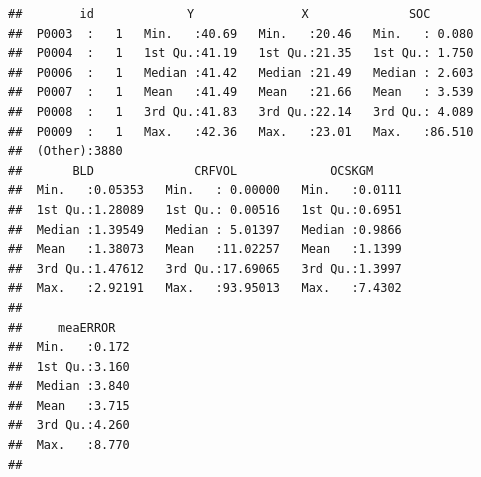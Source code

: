 \documentclass[10pt,b5paper,]{book}
\newenvironment{Shaded}{\begin{snugshade}}{\end{snugshade}}
\newcommand{\CommentTok}[1]{\textcolor[rgb]{0.56,0.35,0.01}{\textit{#1}}}
\newcommand{\DataTypeTok}[1]{\textcolor[rgb]{0.13,0.29,0.53}{#1}}
\newcommand{\DecValTok}[1]{\textcolor[rgb]{0.00,0.00,0.81}{#1}}
\newcommand{\KeywordTok}[1]{\textcolor[rgb]{0.13,0.29,0.53}{\textbf{#1}}}
\newcommand{\NormalTok}[1]{#1}
\newcommand{\OperatorTok}[1]{\textcolor[rgb]{0.81,0.36,0.00}{\textbf{#1}}}
\newcommand{\StringTok}[1]{\textcolor[rgb]{0.31,0.60,0.02}{#1}}
\theoremstyle{definition}
\theoremstyle{definition}
\theoremstyle{definition}
\theoremstyle{remark}
\begin{document}
\begin{Shaded}
\end{Shaded}

\begin{verbatim}
##        id             Y               X              SOC        
##  P0003  :   1   Min.   :40.69   Min.   :20.46   Min.   : 0.080  
##  P0004  :   1   1st Qu.:41.19   1st Qu.:21.35   1st Qu.: 1.750  
##  P0006  :   1   Median :41.42   Median :21.49   Median : 2.603  
##  P0007  :   1   Mean   :41.49   Mean   :21.66   Mean   : 3.539  
##  P0008  :   1   3rd Qu.:41.83   3rd Qu.:22.14   3rd Qu.: 4.089  
##  P0009  :   1   Max.   :42.36   Max.   :23.01   Max.   :86.510  
##  (Other):3880                                                   
##       BLD              CRFVOL             OCSKGM      
##  Min.   :0.05353   Min.   : 0.00000   Min.   :0.0111  
##  1st Qu.:1.28089   1st Qu.: 0.00516   1st Qu.:0.6951  
##  Median :1.39549   Median : 5.01397   Median :0.9866  
##  Mean   :1.38073   Mean   :11.02257   Mean   :1.1399  
##  3rd Qu.:1.47612   3rd Qu.:17.69065   3rd Qu.:1.3997  
##  Max.   :2.92191   Max.   :93.95013   Max.   :7.4302  
##                                                       
##     meaERROR    
##  Min.   :0.172  
##  1st Qu.:3.160  
##  Median :3.840  
##  Mean   :3.715  
##  3rd Qu.:4.260  
##  Max.   :8.770  
## 
\end{verbatim}
\end{document}
